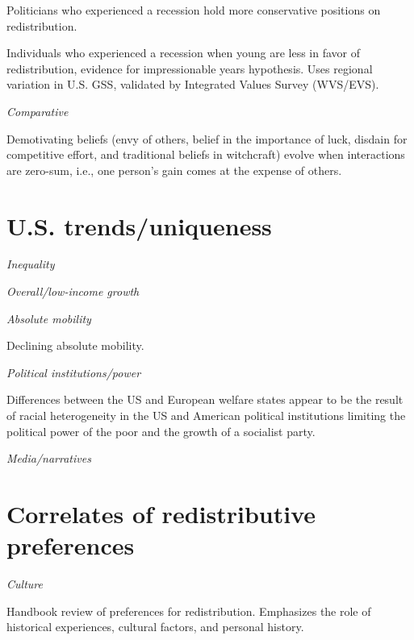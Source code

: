 \documentclass{article}
\newcommand{\citem}[1]{\medskip \noindent \textbf{\cite*{#1}}}
\newcommand{\texth}[1]{\noindent \textit{#1}}
\newcommand{\textm}[1]{\medskip \noindent \textit{#1}}
\begin{document}
Politicians who experienced a recession hold more conservative positions on redistribution.

\citem{giuliano2023recessions}

Individuals who experienced a recession when young are less in favor of redistribution, evidence for impressionable years hypothesis. Uses regional variation in U.S. GSS, validated by Integrated Values Survey (WVS/EVS).

\textm{Comparative}

\citem{carvalho2023zero}

Demotivating beliefs (envy of others, belief in the importance of luck, disdain for competitive
effort, and traditional beliefs in witchcraft) evolve when interactions are zero-sum, i.e., one person's gain comes at the expense of others.



\section*{U.S. trends/uniqueness}

\textm{Inequality}

\textm{Overall/low-income growth}

\textm{Absolute mobility}

\citem{chetty2017fading}

Declining absolute mobility.

\textm{Political institutions/power}

\citem{alesina2001doesn}

Differences between the US and European welfare states appear to be the result of racial heterogeneity in the US and American political institutions limiting the political power of the poor and the growth of a socialist party.

\textm{Media/narratives}




\section*{Correlates of redistributive preferences}

\texth{Culture}

\citem{alesina2011preferences}

Handbook review of preferences for redistribution. Emphasizes the role of historical experiences, cultural factors, and personal history.

\citem{luttmer2011culture}
\end{document}
